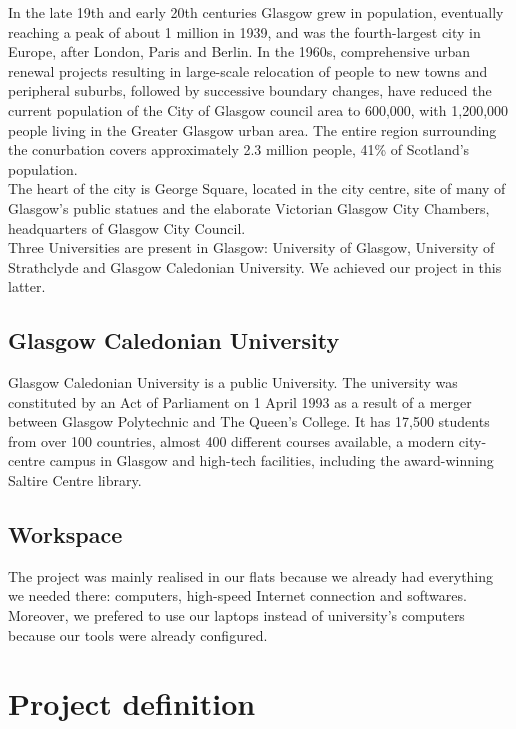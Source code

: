 \documentclass{scrreprt}
\begin{document}
		  In the late 19th and early 20th centuries Glasgow grew in population, eventually
		  reaching a peak of about 1 million in 1939, and was the fourth-largest city in Europe, after
		  London, Paris and Berlin. In the 1960s, comprehensive urban renewal projects resulting in
		  large-scale relocation of people to new towns and peripheral suburbs, followed by
		  successive boundary changes, have reduced the current population of the City of Glasgow
		  council area to 600,000, with 1,200,000 people living in the Greater Glasgow urban area. The
		  entire region surrounding the conurbation covers approximately 2.3 million people, 41\% of
		  Scotland's population.\\

		  The heart of the city is George Square, located in the city centre, site of many of
		  Glasgow's public statues and the elaborate Victorian Glasgow City Chambers, headquarters
		  of Glasgow City Council.\\

		  Three Universities are present in Glasgow: University of Glasgow, University of
		  Strathclyde and Glasgow Caledonian University. We achieved our project in this latter.

		  \section{Glasgow Caledonian University}%
		  Glasgow Caledonian University is a public University. The university was constituted
		  by an Act of Parliament on 1 April 1993 as a result of a merger between Glasgow Polytechnic
		  and The Queen's College. It has 17,500 students from over 100 countries, almost 400
		  different courses available, a modern city-centre campus in Glasgow and high-tech facilities,
		  including the award-winning Saltire Centre library.

		  \section{Workspace}
		  The project was mainly realised in our flats because we already had everything we needed there:
		  computers, high-speed Internet connection and softwares. Moreover, we prefered to use our laptops
		  instead of university's computers because our tools were already configured.

		  \chapter{Project definition}
\end{document}
